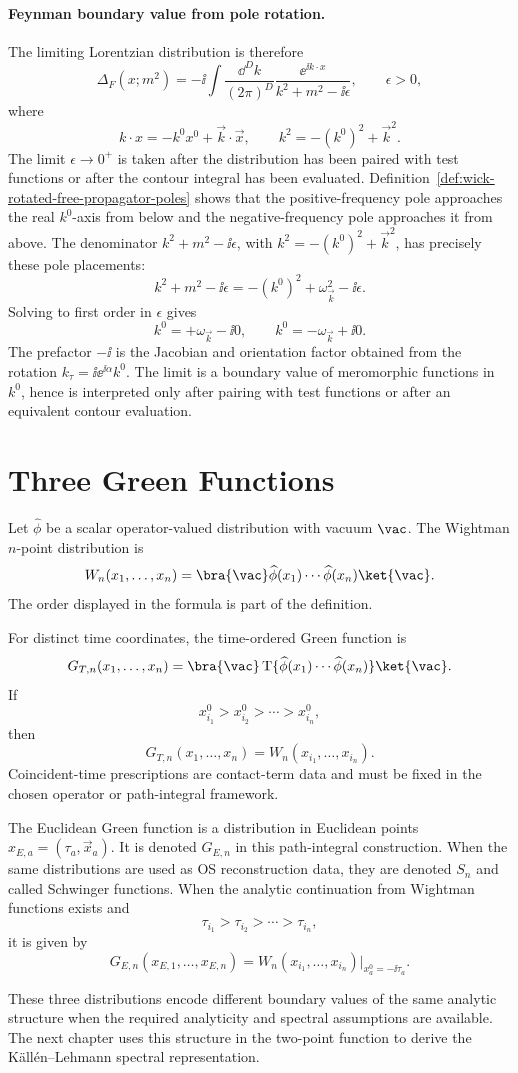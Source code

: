 \paragraph{Feynman boundary value from pole rotation.}
The limiting Lorentzian distribution is therefore
\[
  \Delta_F(x;m^2)
  =
  -\ii
  \int\frac{\dd^Dk}{(2\pi)^D}
  \frac{\ee^{\ii k\cdot x}}{k^2+m^2-\ii\epsilon},
  \qquad
  \epsilon>0,
\]
where
\[
  k\cdot x=-k^0x^0+\vec k\cdot\vec x,
  \qquad
  k^2=-(k^0)^2+\vec k^2.
\]
The limit \(\epsilon\to0^+\) is taken after the distribution has been paired
with test functions or after the contour integral has been evaluated.
Definition~\ref{def:wick-rotated-free-propagator-poles} shows that the
positive-frequency pole approaches the real \(k^0\)-axis from below and the
negative-frequency pole approaches it from above.  The denominator
\(k^2+m^2-\ii\epsilon\), with
\(k^2=-(k^0)^2+\vec k^2\), has precisely these pole placements:
\[
  k^2+m^2-\ii\epsilon
  =
  -(k^0)^2+\omega_{\vec k}^2-\ii\epsilon .
\]
Solving to first order in \(\epsilon\) gives
\[
  k^0=+\omega_{\vec k}-\ii0,
  \qquad
  k^0=-\omega_{\vec k}+\ii0 .
\]
The prefactor \(-\ii\) is the Jacobian and orientation factor obtained from
the rotation \(k_\tau=\ii\ee^{\ii\alpha}k^0\).  The limit is a boundary value
of meromorphic functions in \(k^0\), hence is interpreted only after pairing
with test functions or after an equivalent contour evaluation.

\section{Three Green Functions}

\begin{definition}
\label{def:wightman-time-ordered-euclidean-green-functions}
Let \(\widehat\phi\) be a scalar operator-valued distribution with vacuum
\(\vac\). The Wightman \(n\)-point distribution is
\[
  W_n(x_1,\ldots,x_n)
  =
  \bra{\vac}
  \widehat\phi(x_1)\cdots\widehat\phi(x_n)
  \ket{\vac}.
\]
The order displayed in the formula is part of the definition.

For distinct time coordinates, the time-ordered Green function is
\[
  G_{T,n}(x_1,\ldots,x_n)
  =
  \bra{\vac}
  \operatorname{T}\{
    \widehat\phi(x_1)\cdots\widehat\phi(x_n)
  \}
  \ket{\vac}.
\]
If
\[
  x_{i_1}^0>x_{i_2}^0>\cdots>x_{i_n}^0,
\]
then
\[
  G_{T,n}(x_1,\ldots,x_n)
  =
  W_n(x_{i_1},\ldots,x_{i_n}).
\]
Coincident-time prescriptions are contact-term data and must be fixed in the
chosen operator or path-integral framework.

The Euclidean Green function is a distribution in Euclidean points
\(x_{E,a}=(\tau_a,\vec x_a)\).  It is denoted \(G_{E,n}\) in this
path-integral construction.  When the same distributions are used as OS
reconstruction data, they are denoted \(S_n\) and called Schwinger functions.
When the analytic continuation from Wightman functions exists and
\[
  \tau_{i_1}>\tau_{i_2}>\cdots>\tau_{i_n},
\]
it is given by
\[
  G_{E,n}(x_{E,1},\ldots,x_{E,n})
  =
  W_n(x_{i_1},\ldots,x_{i_n})
  \big|_{x_a^0=-\ii\tau_a}.
\]
\end{definition}

These three distributions encode different boundary values of the same
analytic structure when the required analyticity and spectral assumptions are
available. The next chapter uses this structure in the two-point function to
derive the K\"all\'en--Lehmann spectral representation.
